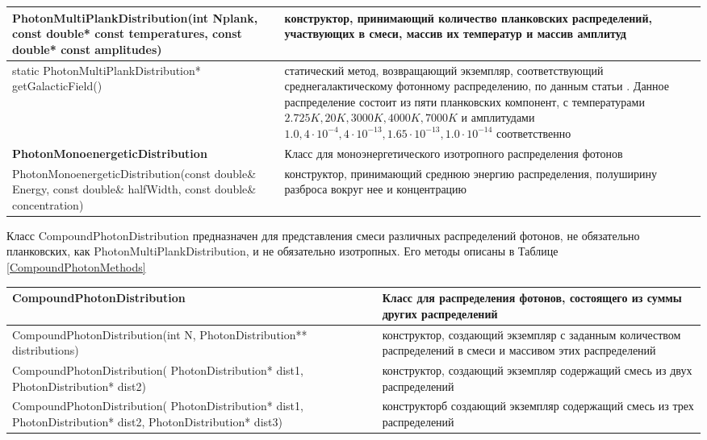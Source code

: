 \begin{small}
\begin{xtabular}{|p{0.45\textwidth}|p{0.55\textwidth}|}
				\hline
				PhotonMultiPlankDistribution(int Nplank, const double* const temperatures, const double* const amplitudes) & конструктор, принимающий количество планковских распределений, участвующих в смеси, массив их температур и массив амплитуд\\
				\hline
				static PhotonMultiPlankDistribution* getGalacticField() & статический метод, возвращающий экземпляр, соответствующий среднегалактическому фотонному распределению, по данным статьи \cite{Mathis1983}. Данное распределение состоит из пяти планковских компонент, с температурами $2.725K, 20K, 3000K, 4000K, 7000K$ и амплитудами $1.0, 4\cdot10^{-4}, 4\cdot10^{-13}, 1.65\cdot10^{-13}, 1.0\cdot10^{-14}$ соответственно\\
				\hline
				\textbf{PhotonMonoenergeticDistribution} & Класс для моноэнергетического изотропного распределения фотонов\\
				\hline
				PhotonMonoenergeticDistribution(const double\& Energy, const double\& halfWidth, const double\& concentration) & конструктор, принимающий среднюю энергию распределения, полуширину разброса вокруг нее и концентрацию\\
				\hline
	\end{xtabular}
\end{small}

Класс CompoundPhotonDistribution предназначен для представления смеси различных распределений фотонов, не обязательно планковских, как PhotonMultiPlankDistribution, и не обязательно изотропных. Его методы описаны в Таблице \ref{CompoundPhotonMethods}

\begin{small}
		\label{CompoundPhotonMethods}
			\begin{xtabular}{|p{0.45\textwidth}|p{0.55\textwidth}|}
				\hline
				\textbf{CompoundPhotonDistribution} & Класс для распределения фотонов, состоящего из суммы других распределений\\
				\hline
				CompoundPhotonDistribution(int N, PhotonDistribution** distributions) & конструктор, создающий экземпляр с заданным количеством распределений в смеси и массивом этих распределений \\
				\hline
				CompoundPhotonDistribution( PhotonDistribution* dist1, PhotonDistribution* dist2) & конструктор, создающий экземпляр содержащий смесь из двух распределений\\
				\hline
				CompoundPhotonDistribution( PhotonDistribution* dist1, PhotonDistribution* dist2, PhotonDistribution* dist3) & конструкторб создающий экземпляр содержащий смесь из трех распределений\\
				\hline
	\end{xtabular}
\end{small}

